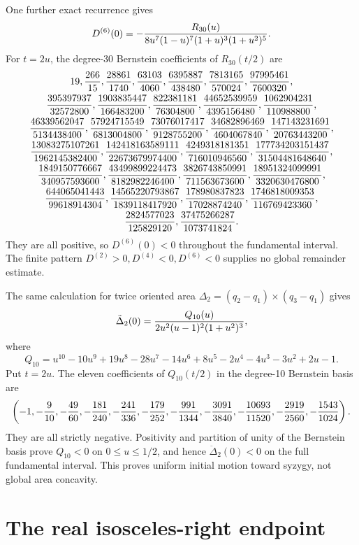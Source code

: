 \documentclass[11pt]{article}
\begin{document}
One further exact recurrence gives
\[
D^{(6)}(0)=-{R_{30}(u)\over
8u^7(1-u)^7(1+u)^3(1+u^2)^5}.
\]
For $t=2u$, the degree-30 Bernstein coefficients of $R_{30}(t/2)$ are
\[
\begin{gathered}
19,{266\over15},{28861\over1740},{63103\over4060},
{6395887\over438480},{7813165\over570024},{97995461\over7600320},\\
{395397937\over32572800},{1903835447\over166483200},
{822381181\over76304800},{44652539959\over4395156480},
{1062904231\over110988800},\\
{46339562047\over5134438400},{57924715549\over6813004800},
{73076017417\over9128755200},{34682896469\over4604067840},
{147143231691\over20763443200},\\
{13083275107261\over1962145382400},
{142418163589111\over22673679974400},
{4249318181351\over716010946560},
{177734203151437\over31504481648640},\\
{1849150776667\over340957593600},
{43499899224473\over8182982246400},
{3826743850991\over711563673600},
{18951324099991\over3320630476800},\\
{644065041443\over99618914304},
{14565220793867\over1839118417920},
{178980837823\over17028874240},
{1746818009353\over116769423360},\\
{2824577023\over125829120},{37475266287\over1073741824}.
\end{gathered}
\]
They are all positive, so $D^{(6)}(0)<0$ throughout the fundamental
interval. The finite pattern $D^{(2)}>0,D^{(4)}<0,D^{(6)}<0$ supplies no
global remainder estimate.

The same calculation for twice oriented area
$\Delta_2=(q_2-q_1)\times(q_3-q_1)$ gives
\[
 \ddot\Delta_2(0)={Q_{10}(u)\over2u^2(u-1)^2(1+u^2)^3},
\]
where
\[
Q_{10}=u^{10}-10u^9+19u^8-28u^7-14u^6+8u^5-2u^4
-4u^3-3u^2+2u-1.
\]
Put $t=2u$.  The eleven coefficients of $Q_{10}(t/2)$ in the degree-10
Bernstein basis are
\[
\left(-1,-{9\over10},-{49\over60},-{181\over240},-{241\over336},
-{179\over252},-{991\over1344},-{3091\over3840},
-{10693\over11520},-{2919\over2560},-{1543\over1024}\right).
\]
They are all strictly negative.  Positivity and partition of unity of the
Bernstein basis prove $Q_{10}<0$ on $0\le u\le1/2$, and hence
$\ddot\Delta_2(0)<0$ on the full fundamental interval. This proves
uniform initial motion toward syzygy, not global area concavity.

\section{The real isosceles-right endpoint}
\end{document}
